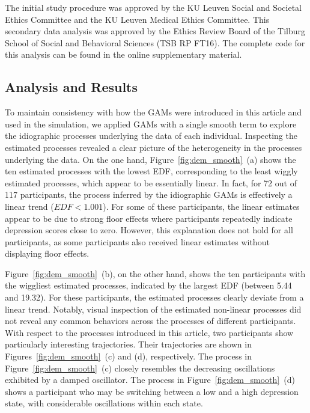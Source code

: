 \documentclass[man, floatsintext]{apa7}
\begin{document}
The initial study procedure was approved by the KU Leuven Social and Societal
Ethics Committee and the KU Leuven Medical Ethics Committee. This secondary
data analysis was approved by the Ethics Review Board of the Tilburg School of
Social and Behavioral Sciences (TSB RP FT16). The complete code for this
analysis can be found in the online supplementary material.

\subsection{Analysis and Results}

To maintain consistency with how the GAMs were introduced in this article and
used in the simulation, we applied GAMs with a single smooth term to explore
the idiographic processes underlying the data of each individual. Inspecting
the estimated processes revealed a clear picture of the heterogeneity in the
processes underlying the data. On the one hand, Figure~\ref{fig:dem_smooth}~(a)
shows the ten estimated processes with the lowest EDF, corresponding to the
least wiggly estimated processes, which appear to be essentially linear. In
fact, for 72 out of 117 participants, the process inferred by the idiographic
GAMs is effectively a linear trend ($EDF < 1.001$). For some of these
participants, the linear estimates appear to be due to strong floor effects
where participants repeatedly indicate depression scores close to zero.
However, this explanation does not hold for all participants, as some
participants also received linear estimates without displaying floor effects.

Figure~\ref{fig:dem_smooth}~(b), on the other hand, shows the ten participants
with the wiggliest estimated processes, indicated by the largest EDF (between
5.44 and 19.32). For these participants, the estimated processes clearly
deviate from a linear trend. Notably, visual inspection of the estimated
non-linear processes did not reveal any common behaviors across the processes
of different participants. With respect to the processes introduced in this
article, two participants show particularly interesting trajectories. Their
trajectories are shown in Figures~\ref{fig:dem_smooth}~(c) and (d),
respectively. The process in Figure~\ref{fig:dem_smooth}~(c) closely resembles
the decreasing oscillations exhibited by a damped oscillator. The process in
Figure~\ref{fig:dem_smooth}~(d) shows a participant who may be switching
between a low and a high depression state, with considerable oscillations
within each state.
\end{document}
